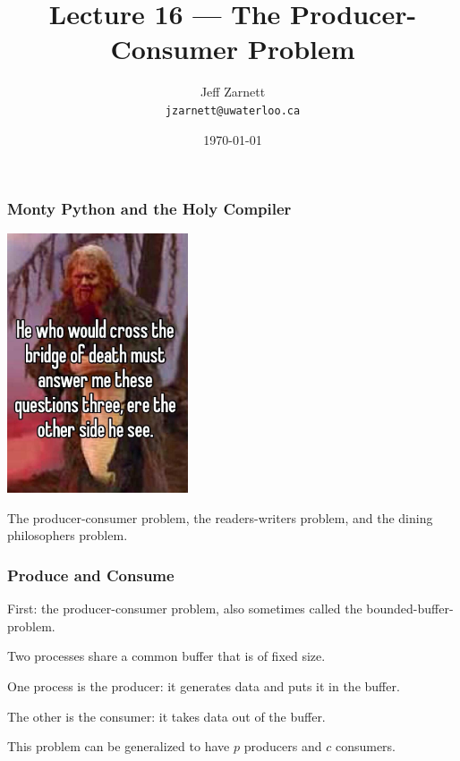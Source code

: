 

\title{Lecture 16 --- The Producer-Consumer Problem }

\author{Jeff Zarnett \\ \small \texttt{jzarnett@uwaterloo.ca}}
\date{\today}




\begin{frame}
  \titlepage

 \end{frame}
 
 
\begin{frame}
\frametitle{Monty Python and the Holy Compiler}

\begin{center}
	\includegraphics[width=0.4\textwidth]{images/three-riddles.jpg}
\end{center}

The producer-consumer problem, the readers-writers problem, and the dining philosophers problem.

\end{frame}


\begin{frame}
\frametitle{Produce and Consume}

First: the producer-consumer problem, also sometimes called the bounded-buffer-problem.

Two processes share a common buffer that is of fixed size.

One process is the producer: it generates data and puts it in the buffer.

The other is the consumer: it takes data out of the buffer.

This problem can be generalized to have $p$ producers and $c$ consumers.

\end{frame}

